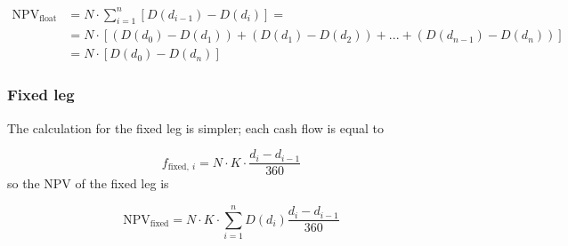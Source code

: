 \begin{equation}
	\begin{split}
		\mathrm{NPV}_{\mathrm{float}} & = N\cdot\sum_{i=1}^{n}[D(d_{i-1}) - D(d_i)] =  \\
		&= N\cdot[(D(d_{0}) - D(d_{1})) + (D(d_{1}) - D(d_{2})) + ... + (D(d_{n-1}) - D(d_{n}))]\\
		&= N \cdot [D(d_0) - D(d_n)]
	\end{split}
\end{equation}

%

\subsubsection{Fixed leg}\label{fixed-leg}

The calculation for the fixed leg is simpler; each cash flow is equal to

\begin{equation}
f_{\mathrm{fixed},~i}=N\cdot K\cdot \frac{d_i - d_{i-1}}{360}
\end{equation}
so the NPV of the fixed leg is

\begin{equation}
\mathrm{NPV}_{\mathrm{fixed}} = N\cdot K\cdot \sum_{i=1}^{n}D(d_{i})\frac{d_i - d_{i-1}}{360}
\end{equation}


